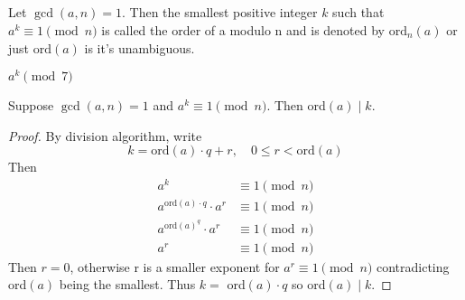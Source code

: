     \subsection{}
    \begin{definition}
        Let $\gcd(a,n)=1$. Then the smallest positive integer $k$ such that
        $a^k\equiv 1\pmod{n}$ is called the order of a modulo n and is denoted by 
        $\text{ord}_n(a)$ or just $\text{ord}(a)$ is it's unambiguous.
    \end{definition}
    \begin{example}
        $a^k\pmod{7}$
    \end{example}
    \begin{theorem}
        Suppose $\gcd(a,n)=1$ and $a^k\equiv 1\pmod{n}$. Then ord$(a)\mid k$.
        \begin{proof}
            By division algorithm, write
            \[ k = \text{ord}(a)\cdot q + r, \quad 0\le r<\text{ord}(a) \]
            Then 
            \begin{align*}
                a^k &\equiv 1\pmod{n} \\
                a^{\text{ord}(a)\cdot q}\cdot a^r &\equiv 1\pmod{n} \\
                a^{\text{ord}(a)^q}\cdot a^r &\equiv 1\pmod{n} \\
                a^r &\equiv 1\pmod{n}
            \end{align*}
            Then $r=0$, otherwise r is a smaller exponent for $a^r\equiv 1\pmod{n}$
            contradicting ord$(a)$ being the smallest. 
            Thus $k=$ ord$(a)\cdot q$ so ord$(a)\mid k$.
        \end{proof}
    \end{theorem}